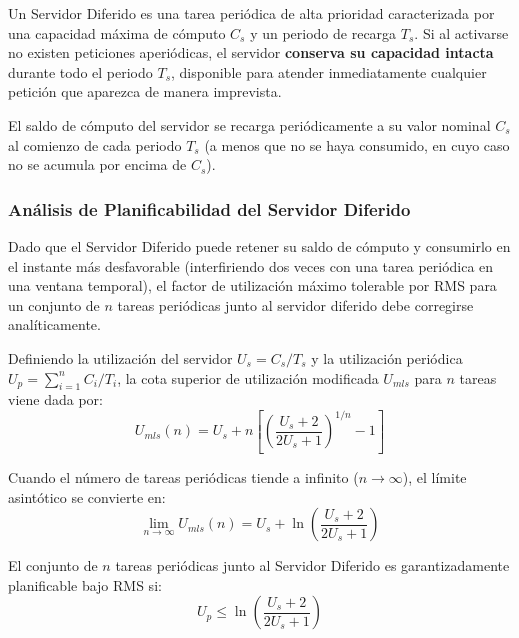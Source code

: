 \begin{definicion}
Un Servidor Diferido es una tarea periódica de alta prioridad caracterizada por una capacidad máxima de cómputo $C_s$ y un periodo de recarga $T_s$. Si al activarse no existen peticiones aperiódicas, el servidor \textbf{conserva su capacidad intacta} durante todo el periodo $T_s$, disponible para atender inmediatamente cualquier petición que aparezca de manera imprevista.
\end{definicion}

El saldo de cómputo del servidor se recarga periódicamente a su valor nominal $C_s$ al comienzo de cada periodo $T_s$ (a menos que no se haya consumido, en cuyo caso no se acumula por encima de $C_s$).

\subsubsection{Análisis de Planificabilidad del Servidor Diferido}
Dado que el Servidor Diferido puede retener su saldo de cómputo y consumirlo en el instante más desfavorable (interfiriendo dos veces con una tarea periódica en una ventana temporal), el factor de utilización máximo tolerable por RMS para un conjunto de $n$ tareas periódicas junto al servidor diferido debe corregirse analíticamente.

Definiendo la utilización del servidor $U_s = C_s / T_s$ y la utilización periódica $U_p = \sum_{i=1}^n C_i / T_i$, la cota superior de utilización modificada $U_{mls}$ para $n$ tareas viene dada por:
\begin{equation}
U_{mls}(n) = U_s + n \left[ \left( \frac{U_s + 2}{2U_s + 1} \right)^{1/n} - 1 \right]
\end{equation}

Cuando el número de tareas periódicas tiende a infinito ($n \to \infty$), el límite asintótico se convierte en:
\begin{equation}
\lim_{n \to \infty} U_{mls}(n) = U_s + \ln \left( \frac{U_s + 2}{2U_s + 1} \right)
\end{equation}

\begin{tcolorbox}[colback=scdLightOrange,colframe=scdOrange,title=\textbf{Condición de Planificabilidad con Servidor Diferido},arc=3pt]
El conjunto de $n$ tareas periódicas junto al Servidor Diferido es garantizadamente planificable bajo RMS si:
\begin{equation}
U_p \le \ln \left( \frac{U_s + 2}{2U_s + 1} \right)
\end{equation}
\end{tcolorbox}

